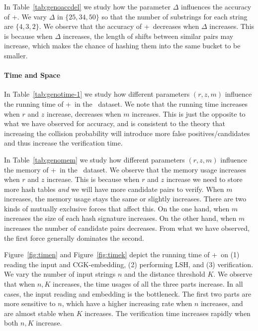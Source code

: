 In Table~\ref{tab:genoaccdel} we study how the parameter $\Delta$ influences the accuracy of \ebdjoin+. We vary $\Delta$ in $\{25, 34, 50\}$ so that the number of substrings for each string are  $\{4, 3, 2\}$. We observe that the accuracy of \ebdjoin+\ decreases when $\Delta$ increases. This is because when $\Delta$ increases, the length of shifts between similar pairs may increase, which makes the chance of hashing them into the same bucket to be smaller. 



\paragraph{Time and Space}
In Table~\ref{tab:genotime-1} we study how different parameters $(r, z, m)$ influence the running time of \ebdjoin+\ in the \genoa\ dataset.  We note that the running time increases when $r$ and $z$ increase, decreases when $m$ increases.  This is just the opposite to what we have observed for accuracy, and is consistent to the theory that increasing the collision probability will introduce more false positives/candidates and thus increase the verification time.  

 
In Table~\ref{tab:genomem} we study how different parameters $(r, z, m)$ influence the memory of \ebdjoin+\ in the \genoa\ dataset. 
We observe that the memory usage increases when $r$ and $z$ increase. This is because when $r$ and $z$ increase we need to store more hash tables {\em and} we will have more candidate pairs to verify.  When $m$ increases, the memory usage stays the same or slightly increases.  There are two kinds of mutually exclusive forces that affect this.  On the one hand, when $m$ increases the size of each hash signature increases.  On the other hand, when $m$ increases the number of candidate pairs decreases. From what we have observed, the first force generally dominates the second.


Figure~\ref{fig:timen} and Figure~\ref{fig:timek} depict the running time of \ebdjoin+\ on (1) reading the input and CGK-embedding, (2) performing LSH, and (3) verification. We vary the number of input strings $n$ and the distance threshold $K$.  We observe that when $n,K$ increases, the time usages of all the three parts increase.  In all cases, the input reading and embedding is the bottleneck.  The first two parts are more sensitive to $n$, which have a higher increasing rate when $n$ increases, and are almost stable when $K$ increases. The verification time increases rapidly when both $n,K$ increase.


